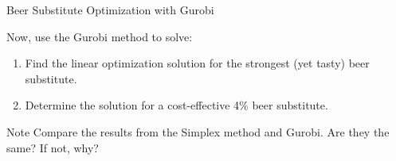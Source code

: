\documentclass[
    NAME={Dr. Helga Ingimundardóttir},
    EMAIL={helgaingim@hi.is},
    FACULTY={Industrial Engineering},
    TITLE={Linear Optimization},
    SUBTITLE={Fundamentals and Applications},
    SEMINAR={VÉL113F},
    DATE={Design and Optimization}
]{HI-latex/hi-beamer}
\begin{document}
    \begin{frame}[allowframebreaks]{Beer Substitute Optimization with Gurobi}
        \label{example:beer:guriobi}
        \begin{example}
            Now, use the Gurobi method to solve:
            \begin{enumerate}
                \item Find the linear optimization solution for the strongest (yet tasty) beer substitute.
                \item Determine the solution for a cost-effective 4\% beer substitute.
            \end{enumerate}
        \end{example}

        \begin{alertblock}{Note}
            Compare the results from the Simplex method and Gurobi. Are they the same? If not, why?
        \end{alertblock}

    \end{frame}
\end{document}
